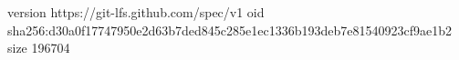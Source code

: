 version https://git-lfs.github.com/spec/v1
oid sha256:d30a0f17747950e2d63b7ded845c285e1ec1336b193deb7e81540923cf9ae1b2
size 196704
